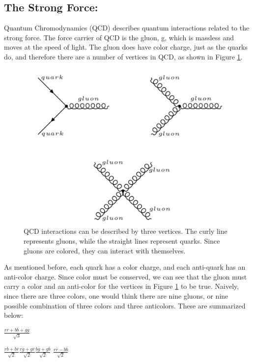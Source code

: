 \subsection{The Strong Force:}
Quantum Chromodynamics (QCD) describes quantum interactions related to the strong force. The force carrier of QCD is the gluon, g, which is massless and moves at the speed of light. The gluon does have color charge, just as the quarks do, and therefore there are a number of vertices in QCD, as shown in Figure \ref{Fig:Intro:Vertex2}.
\begin{figure}[h]
    \centering
        \includegraphics[width=\textwidth]{F1/Vertex2}
        \caption{QCD interactions can be described by three vertices. The curly line represents gluons, while the straight lines represent quarks. Since gluons are colored, they can interact with themselves.}
        \label{Fig:Intro:Vertex2}
\end{figure}
As mentioned before, each quark has a color charge, and each anti-quark has an anti-color charge. Since color must be conserved, we can see that the gluon must carry a color and an anti-color for the vertices in Figure \ref{Fig:Intro:Vertex2} to be true. Naively, since there are three colors, one would think there are nine gluons, or nine possible combination of three colors and three anticolors. These are summarized below:

{\centering

$\frac{r\overline{r} + b\overline{b} + g\overline{g}}{\sqrt{3}}$

}

{\centering

    $\frac{r\overline{b} + b\overline{r}}{\sqrt{2}}$\hspace{1cm}$\frac{r\overline{g} + g\overline{r}}{\sqrt{2}}$\hspace{1cm}$\frac{b\overline{g} + g\overline{b}}{\sqrt{2}}$\hspace{1cm} $\frac{r\overline{r} - b\overline{b}}{\sqrt{2}}$
    
    }

